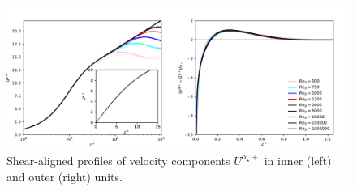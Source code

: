 \documentclass[a4paper,11pt]{amsart}
\begin{document}
%
\begin{figure}
  \includegraphics[width=\textwidth]{../plot/u_profile.pdf}
  \caption{Shear-aligned profiles of velocity components $U^{\alpha_\star+}$ in inner (left) and outer (right) units.} 
\end{figure} 
%
%
\end{document}

